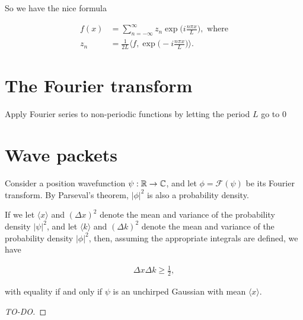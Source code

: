 \documentclass{article}
\begin{document}
So we have the nice formula

\begin{align*}
	f(x) &= \sum_{n = -\infty}^\infty z_n \exp\Big(i \frac{n \pi x}{L}\Big), \text{ where} \\
	z_n &= \frac{1}{2L} \Big\langle f, \exp\Big(-i\frac{n\pi x}{L}\Big) \Big\rangle.
\end{align*}

\newpage

\section*{The Fourier transform}

Apply Fourier series to non-periodic functions by letting the period $L$ go to $0$

\section*{Wave packets}

\begin{theorem}
	Consider a position wavefunction $\psi: \mathbb{R} \rightarrow \mathbb{C}$, and let $\phi = \mathcal{F}(\psi)$ be its Fourier transform. By Parseval's theorem, $|\phi|^2$ is also a probability density.
	
	If we let $\langle x \rangle$ and $(\Delta x)^2$ denote the mean and variance of the probability density $|\psi|^2$, and let $\langle k \rangle$ and $(\Delta k)^2$ denote the mean and variance of the probability density $|\phi|^2$, then, assuming the appropriate integrals are defined, we have
	
	\begin{align*}
		\Delta x \Delta k \geq \frac{1}{2},
	\end{align*}
	
	with equality if and only if $\psi$ is an unchirped Gaussian with mean $\langle x \rangle$.
\end{theorem}

\begin{proof}
	[TO-DO]
\end{proof}
\end{document}
